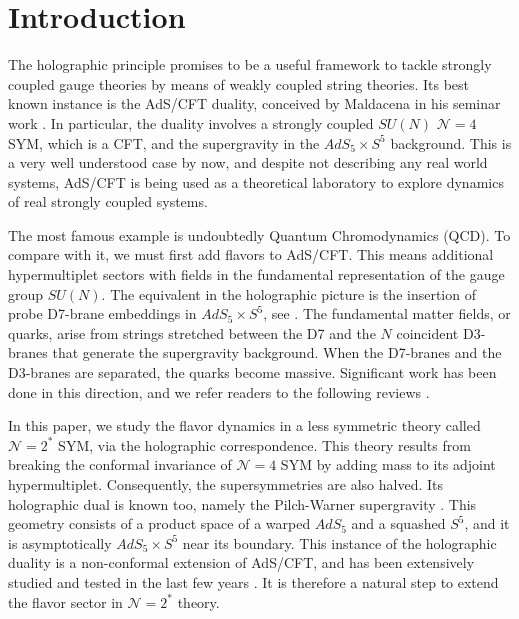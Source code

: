 \section{Introduction}

The holographic principle promises to be a useful framework to tackle strongly coupled gauge theories by means of weakly coupled string theories. Its best known instance is the AdS/CFT duality, conceived by Maldacena in his seminar work \cite{Maldacena:1997re}. In particular, the duality involves a strongly coupled $SU(N)$ $\mathcal{N}=4$ SYM, which is a CFT, and the supergravity in the $AdS_5 \times S^5$ background. This is a very well understood case by now, and despite not describing any real world systems, AdS/CFT is being used as a theoretical laboratory to explore dynamics of real strongly coupled systems.

The most famous example is undoubtedly Quantum Chromodynamics (QCD). To compare with it, we must first add flavors to AdS/CFT. This means additional hypermultiplet sectors with fields in the fundamental representation of the gauge group $SU(N)$. The equivalent in the holographic picture is the insertion of probe D7-brane embeddings in $AdS_5 \times S^5$, see \cite{Karch:2002sh}. The fundamental matter fields, or quarks, arise from strings stretched between the D7 and the $N$ coincident D3-branes that generate the supergravity background. When the D7-branes and the D3-branes are separated, the quarks become massive. Significant work has been done in this direction, and we refer readers to the following reviews \cite{CasalderreySolana:2011us, Erdmenger:2007cm}.

In this paper, we study the flavor dynamics in a less symmetric theory called $\mathcal{N}=2^*$ SYM, via the holographic correspondence. This theory results from breaking the conformal invariance of $\mathcal{N}=4$ SYM by adding mass to its adjoint hypermultiplet. Consequently, the supersymmetries are also halved. Its holographic dual is known too, namely the Pilch-Warner supergravity \cite{Pilch:2000ue, Pilch:2003jg}. This geometry consists of a product space of a warped $AdS_5$ and a squashed $S^5$, and it is asymptotically $AdS_5 \times S^5$ near its boundary. This instance of the holographic duality is a non-conformal extension of AdS/CFT, and has been extensively studied and tested in the last few years \cite{Buchel:2013id, Chen-Lin:2015xlh, Chen-Lin:2017pay, Russo:2019lgq}. It is therefore a natural step to extend the flavor sector in $\mathcal{N}=2^*$ theory. 

